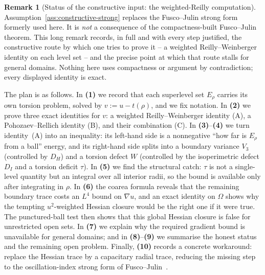 \documentclass[11pt]{amsart}
\theoremstyle{definition}
\newtheorem{remark}[theorem]{Remark}
\newcommand{\Om}{\Omega}
\begin{document}
\begin{remark}[Status of the constructive input: the weighted-Reilly computation]
\label{rem:constructive-strong-status}
Assumption~\ref{ass:constructive-strong} replaces the Fusco--Julin strong form
formerly used here.  It is \emph{not} a consequence of the compactness-built
Fusco--Julin theorem.  This long remark records, in full and with every step
justified, the constructive route by which one tries to prove it -- a weighted
Reilly--Weinberger identity on each level set -- and the precise point at which
that route stalls for general domains.  Nothing here uses compactness or
argument by contradiction; every displayed identity is exact.

The plan is as follows.  In \textbf{(1)} we record that each superlevel set
\(E_\rho\) carries its own torsion problem, solved by \(v:=u-t(\rho)\), and we fix
notation.  In \textbf{(2)} we prove three exact identities for \(v\): a weighted
Reilly--Weinberger identity (A), a Pohozaev--Rellich identity (B), and their
combination (C).  In \textbf{(3)}--\textbf{(4)} we turn identity~(A) into an
inequality: its left-hand side is a nonnegative ``how far is \(E_\rho\) from a
ball'' energy, and its right-hand side splits into a boundary variance \(V_3\)
(controlled by \(D_H\)) and a torsion defect \(W\) (controlled by the
isoperimetric defect \(D_I\) and a torsion deficit \(\tau\)).  In \textbf{(5)} we
find the structural catch: \(\tau\) is not a single-level quantity but an
integral over all interior radii, so the bound is available only after
integrating in \(\rho\).  In \textbf{(6)} the coarea formula reveals that the
remaining boundary trace costs an \(L^4\) bound on \(\nabla u\), and an exact
identity on \(\Om\) shows why the tempting \(u^2\)-weighted Hessian closure would
be the right one if it were true.  The punctured-ball test then shows that this
global Hessian closure is false for unrestricted open sets.  In \textbf{(7)} we
explain why the required gradient bound is unavailable for general domains; and
in \textbf{(8)}--\textbf{(9)} we summarise the honest status and the remaining
open problem.  Finally, \textbf{(10)} records a concrete workaround: replace the
Hessian trace by a capacitary radial trace, reducing the missing step to the
oscillation-index strong form of Fusco--Julin~\cite{FJ2014}.


\end{remark}
\end{document}
